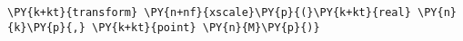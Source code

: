 \begin{Verbatim}[commandchars=\\\{\}]
    \PY{k+kt}{transform} \PY{n+nf}{xscale}\PY{p}{(}\PY{k+kt}{real} \PY{n}{k}\PY{p}{,} \PY{k+kt}{point} \PY{n}{M}\PY{p}{)}
\end{Verbatim}

